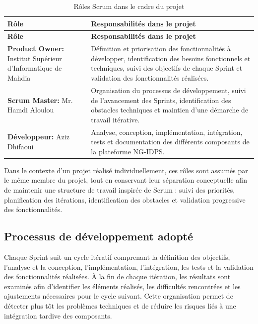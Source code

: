 \renewcommand{\arraystretch}{1.5}
\begin{xltabular}{\textwidth}{|l|>{\raggedright\arraybackslash}X|}

\caption{Rôles Scrum dans le cadre du projet}
\label{tab:roles_scrum} \\

\hline
{}
\textbf{Rôle} & \textbf{Responsabilités dans le projet} \\ \hline
\endfirsthead

\hline
{}
\textbf{Rôle} & \textbf{Responsabilités dans le projet} \\ \hline
\endhead

\textbf{Product Owner:} Institut Supérieur d'Informatique de Mahdia &
Définition et priorisation des fonctionnalités à développer, identification des besoins fonctionnels et techniques, suivi des objectifs de chaque Sprint et validation des fonctionnalités réalisées. \\ \hline

\textbf{Scrum Master:} Mr. Hamdi Aloulou &
Organisation du processus de développement, suivi de l'avancement des Sprints, identification des obstacles techniques et maintien d'une démarche de travail itérative. \\ \hline

\textbf{Développeur:} Aziz Dhifaoui &
Analyse, conception, implémentation, intégration, tests et documentation des différents composants de la plateforme NG-IDPS. \\ \hline

\end{xltabular}

Dans le contexte d'un projet réalisé individuellement, ces rôles sont assumés par le même membre du projet, tout en conservant leur séparation conceptuelle afin de maintenir une structure de travail inspirée de Scrum : suivi des priorités, planification des itérations, identification des obstacles et validation progressive des fonctionnalités.

\subsection{Processus de développement adopté}

Chaque Sprint suit un cycle itératif comprenant la définition des objectifs, l'analyse et la conception, l'implémentation, l'intégration, les tests et la validation des fonctionnalités réalisées. À la fin de chaque itération, les résultats sont examinés afin d'identifier les éléments réalisés, les difficultés rencontrées et les ajustements nécessaires pour le cycle suivant. Cette organisation permet de détecter plus tôt les problèmes techniques et de réduire les risques liés à une intégration tardive des composants.

